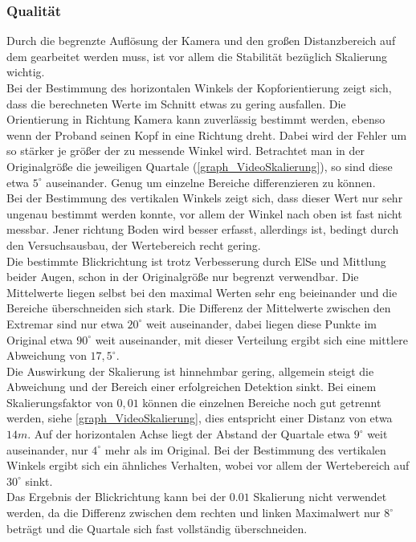 \subsubsection{Qualität}
Durch die begrenzte Auflösung der Kamera und den großen Distanzbereich auf dem gearbeitet werden muss, ist vor allem die Stabilität bezüglich Skalierung wichtig.\\
Bei der Bestimmung des horizontalen Winkels der Kopforientierung zeigt sich, dass die berechneten Werte im Schnitt etwas zu gering ausfallen. Die Orientierung in Richtung Kamera kann zuverlässig bestimmt werden, ebenso wenn der Proband seinen Kopf in eine Richtung dreht. Dabei wird der Fehler um so stärker je größer der zu messende Winkel wird. Betrachtet man in der Originalgröße die jeweiligen Quartale (\autoref{graph_VideoSkalierung}), so sind diese etwa $5^\circ$ auseinander. Genug um einzelne Bereiche differenzieren zu können.\\
Bei der Bestimmung des vertikalen Winkels zeigt sich, dass dieser Wert nur sehr ungenau bestimmt werden konnte, vor allem der Winkel nach oben ist fast nicht messbar. Jener richtung Boden wird besser erfasst, allerdings ist, bedingt durch den Versuchsausbau, der Wertebereich recht gering.\\
Die bestimmte Blickrichtung ist trotz Verbesserung durch ElSe und Mittlung beider Augen, schon in der Originalgröße nur begrenzt verwendbar. Die Mittelwerte liegen selbst bei den maximal Werten sehr eng beieinander und die Bereiche überschneiden sich stark. Die Differenz der Mittelwerte zwischen den Extremar sind nur etwa $20^\circ$ weit auseinander, dabei liegen diese Punkte im Original etwa $90^\circ$ weit auseinander, mit dieser Verteilung ergibt sich eine mittlere Abweichung von $17,5^\circ$. \\
Die Auswirkung der Skalierung ist hinnehmbar gering, allgemein steigt die Abweichung und der Bereich einer erfolgreichen Detektion sinkt. Bei einem Skalierungsfaktor von $0,01$ können die einzelnen Bereiche noch gut getrennt werden, siehe \autoref{graph_VideoSkalierung}, dies entspricht einer Distanz von etwa $14m$. Auf der horizontalen Achse liegt der Abstand der Quartale etwa $9^\circ$ weit auseinander, nur $4^\circ$ mehr als im Original. Bei der Bestimmung des vertikalen Winkels ergibt sich ein ähnliches Verhalten, wobei vor allem der Wertebereich auf $30^\circ$ sinkt.\\
Das Ergebnis der Blickrichtung kann bei der $0.01$ Skalierung nicht verwendet werden, da die Differenz zwischen dem rechten und linken Maximalwert nur $8^\circ$ beträgt und die Quartale sich fast vollständig überschneiden.\\
